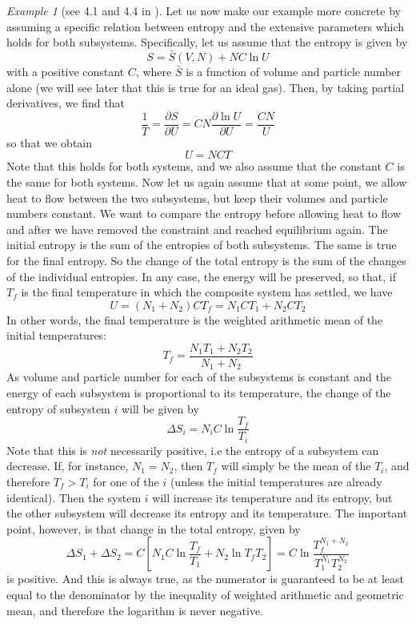 \documentclass[a4paper, draft]{report}
\numberwithin{section}{chapter}
\numberwithin{equation}{chapter}
\theoremstyle{own}
\theoremstyle{remark}
\newtheorem{example}{Example}[section]
\begin{document}
\begin{example}[see 4.1 and 4.4 in \cite{Callen}]\label{ex:idealgascomposite}
Let us now make our example more concrete by assuming a specific relation between entropy and the extensive parameters which holds for both subsystems. Specifically, let us assume that the entropy is given by
$$
S = \bar{S}(V,N) + N C \ln U
$$
with a positive constant $C$, where $\bar{S}$ is a function of volume and particle number alone (we will see later that this is true for an ideal gas). Then, by taking partial derivatives, we find that
$$
\frac{1}{T} = \frac{\partial S}{\partial U} = CN \frac{\partial \ln U}{\partial U} = \frac{CN}{U}
$$
so that we obtain
$$
U = NCT
$$
Note that this holds for both systems, and we also assume that the constant $C$ is the same for both systems. Now let us again assume that at some point, we allow heat to flow between the two subsystems, but keep their volumes and particle numbers constant. We want to compare the entropy before allowing heat to flow and after we have removed the constraint and reached equilibrium again. The initial entropy is the sum of the entropies of both subsystems. The same is true for the final entropy. So the change of the total entropy is the sum of the changes of the individual entropies. In any case, the energy will be preserved, so that, if $T_f$ is the final temperature in which the composite system has settled, we have
$$
U = (N_1 + N_2) C T_f = N_1 C T_1 + N_2 C T_2
$$
In other words, the final temperature is the weighted arithmetic mean of the initial temperatures:
$$
T_f = \frac{N_1 T_1 + N_2 T_2}{N_1 + N_2}
$$
As volume and particle number for each of the subsystems is constant and the energy of each subsystem is proportional to its temperature, the change of the entropy of subsystem $i$ will be given by
$$
\Delta S_i = N_i C \ln \frac{T_f}{T_i}
$$
Note that this is {\em not} necessarily positive, i.e the entropy of a subsystem can decrease. If, for instance, $N_1 = N_2$, then $T_f$ will simply be the mean of the $T_i$, and therefore $T_f > T_i$ for one of the $i$ (unless the initial temperatures are already identical). Then the system $i$ will increase its temperature and its entropy, but the other subsystem will decrease its entropy and its temperature. The important point, however, is that change in the total entropy, given by
$$
\Delta S_1 + \Delta S_2 = C [N_1 C\ln \frac{T_f}{T_1} + N_2 \ln {T_f}{T_2}] 
= C \ln \frac{T_f^{N_1 + N_2}}{T_1^{N_1} T_2^{N_2}}
$$
is positive. And this is always true, as the numerator is guaranteed to be at least equal to the denominator by the inequality of weighted arithmetic and geometric mean, and therefore the logarithm is never negative.
\end{example}
\end{document}
